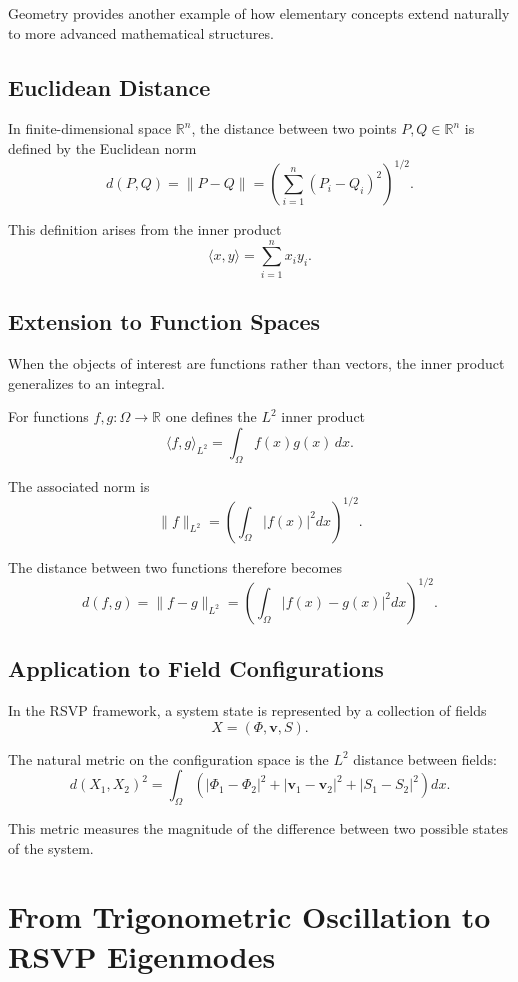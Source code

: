 \documentclass[11pt, openany]{book}
\theoremstyle{plain}
\theoremstyle{definition}
\theoremstyle{remark}
\begin{document}
Geometry provides another example of how elementary concepts extend
naturally to more advanced mathematical structures.

\subsection*{Euclidean Distance}

In finite-dimensional space $\mathbb{R}^n$, the distance between two
points $P,Q\in\mathbb{R}^n$ is defined by the Euclidean norm
\[
d(P,Q)=\|P-Q\|
=
\left(
\sum_{i=1}^n (P_i-Q_i)^2
\right)^{1/2}.
\]

This definition arises from the inner product
\[
\langle x,y\rangle=\sum_{i=1}^n x_i y_i.
\]

\subsection*{Extension to Function Spaces}

When the objects of interest are functions rather than vectors, the
inner product generalizes to an integral.

For functions $f,g:\Omega\to\mathbb{R}$ one defines the
$L^2$ inner product
\[
\langle f,g\rangle_{L^2}
=
\int_\Omega f(x)g(x)\,dx.
\]

The associated norm is
\[
\|f\|_{L^2}
=
\left(
\int_\Omega |f(x)|^2 dx
\right)^{1/2}.
\]

The distance between two functions therefore becomes
\[
d(f,g)=\|f-g\|_{L^2}
=
\left(
\int_\Omega |f(x)-g(x)|^2 dx
\right)^{1/2}.
\]

\subsection*{Application to Field Configurations}

In the RSVP framework, a system state is represented by a collection of
fields
\[
X=(\Phi,\mathbf{v},S).
\]

The natural metric on the configuration space is the $L^2$ distance
between fields:
\[
d(X_1,X_2)^2
=
\int_\Omega
\left(
|\Phi_1-\Phi_2|^2
+
|\mathbf{v}_1-\mathbf{v}_2|^2
+
|S_1-S_2|^2
\right)dx.
\]

This metric measures the magnitude of the difference between two
possible states of the system.

\section{From Trigonometric Oscillation to RSVP Eigenmodes}
\end{document}
